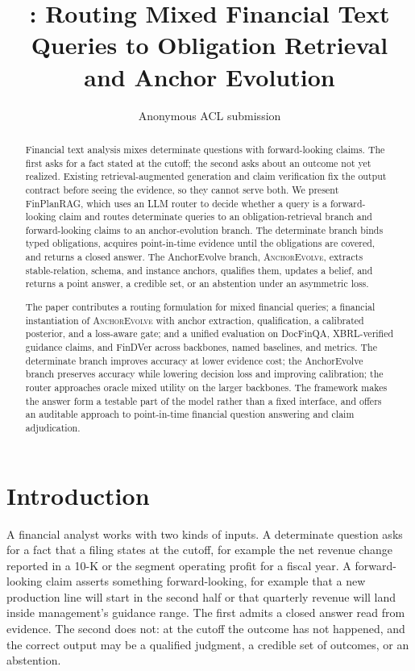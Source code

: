\documentclass[11pt]{article}
\title{\method: Routing Mixed Financial Text Queries to Obligation Retrieval and Anchor Evolution}
\author{Anonymous ACL submission}
\newcommand{\method}{FinPlanRAG}
\newcommand{\anchor}{\textsc{AnchorEvolve}}
\begin{document}
\sloppy
\maketitle

\begin{abstract}
Financial text analysis mixes determinate questions with forward-looking claims. The first asks for a fact stated at the cutoff; the second asks about an outcome not yet realized. Existing retrieval-augmented generation and claim verification fix the output contract before seeing the evidence, so they cannot serve both. We present \method, which uses an LLM router to decide whether a query is a forward-looking claim and routes determinate queries to an obligation-retrieval branch and forward-looking claims to an anchor-evolution branch. The determinate branch binds typed obligations, acquires point-in-time evidence until the obligations are covered, and returns a closed answer. The AnchorEvolve branch, \anchor, extracts stable-relation, schema, and instance anchors, qualifies them, updates a belief, and returns a point answer, a credible set, or an abstention under an asymmetric loss.

The paper contributes a routing formulation for mixed financial queries; a financial instantiation of \anchor{} with anchor extraction, qualification, a calibrated posterior, and a loss-aware gate; and a unified evaluation on DocFinQA, XBRL-verified guidance claims, and FinDVer across backbones, named baselines, and metrics. The determinate branch improves accuracy at lower evidence cost; the AnchorEvolve branch preserves accuracy while lowering decision loss and improving calibration; the router approaches oracle mixed utility on the larger backbones. The framework makes the answer form a testable part of the model rather than a fixed interface, and offers an auditable approach to point-in-time financial question answering and claim adjudication.
\end{abstract}

\section{Introduction}

A financial analyst works with two kinds of inputs. A determinate question asks for a fact that a filing states at the cutoff, for example the net revenue change reported in a 10-K or the segment operating profit for a fiscal year. A forward-looking claim asserts something forward-looking, for example that a new production line will start in the second half or that quarterly revenue will land inside management's guidance range. The first admits a closed answer read from evidence. The second does not: at the cutoff the outcome has not happened, and the correct output may be a qualified judgment, a credible set of outcomes, or an abstention.
\end{document}
